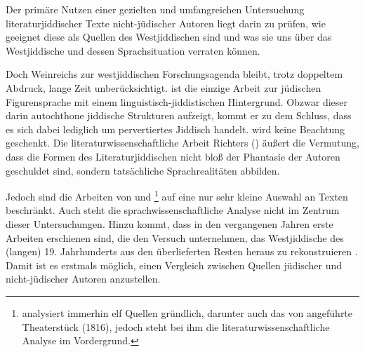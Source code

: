  Der primäre Nutzen einer gezielten und umfangreichen Untersuchung literaturjiddischer Texte nicht-jüdischer Autoren liegt darin zu prüfen, wie geeignet diese als Quellen  des Westjiddischen sind und was sie uns über das Westjiddische und dessen Sprachsituation verraten können.

Doch Weinreichs  zur westjiddischen Forschungsagenda bleibt, trotz doppeltem Abdruck, lange Zeit unberücksichtigt. \cite{Althaus1981} ist die einzige Arbeit zur jüdischen Figurensprache mit einem linguistisch-jiddistischen Hintergrund. Obzwar dieser darin autochthone jiddische Strukturen aufzeigt, kommt er zu dem Schluss, dass es sich dabei lediglich um pervertiertes Jiddisch handelt. \cite{Weinreich1953} wird keine Beachtung geschenkt. Die literaturwissenschaftliche Arbeit Richters (\citeyear[insbes.\,99–113]{Richter1995}) äußert die Vermutung, dass die Formen des Literaturjiddischen nicht bloß der Phantasie der Autoren geschuldet sind, sondern tatsächliche Sprachrealitäten abbilden. 

Jedoch sind die Arbeiten von  \cite{Althaus1981} und \cite{Richter1995}\footnote{\citeauthor{Richter1995} analysiert immerhin elf Quellen gründlich, darunter auch das von \cite[62]{Weinreich1953} angeführte Theaterstück  (1816), jedoch steht bei ihm die literaturwissenschaftliche Analyse im Vordergrund.} auf eine nur sehr kleine Auswahl an Texten beschränkt. Auch steht die sprachwissenschaftliche Analyse nicht im Zentrum dieser Untersuchungen. Hinzu kommt, dass in den vergangenen Jahren erste Arbeiten erschienen sind, die den Versuch unternehmen, das Westjiddische des (langen) 19. Jahrhunderts aus den überlieferten Resten heraus zu rekonstruieren \citep{AptrootGruschka2004,Reershemius2007,Reershemius2014,Schaefer2008,Schaefer2010,Schaefer2013,Schaefer2014,Weisskirchen2011,FleischerSchaefer2012}. Damit ist es erstmals möglich, einen Vergleich zwischen Quellen jüdischer und nicht-jüdischer Autoren anzustellen.


